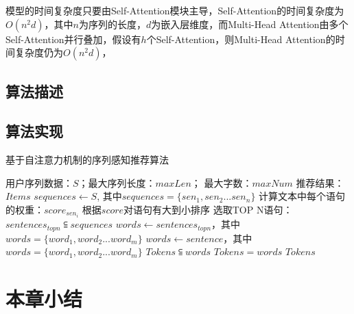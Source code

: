 模型的时间复杂度只要由Self-Attention模块主导，Self-Attention的时间复杂度为$O(n^{2} d)$，其中$n$为序列的长度，$d$为嵌入层维度，而Multi-Head Attention由多个Self-Attention并行叠加，假设有$h$个Self-Attention，则Multi-Head Attention的时间复杂度仍为$O(n^{2} d)$，


\subsection{算法描述}


\subsection{算法实现}
\begin{algorithm}[htbp]
	\caption{基于自注意力机制的序列感知推荐算法}
	\label{alg:self-attention}
		\begin{algorithmic}[1]
			\REQUIRE 用户序列数据：$S$；最大序列长度：$maxLen$； 最大字数：$maxNum$
			\ENSURE 推荐结果：$Items$
			\STATE $sequences \leftarrow S$, 其中$sequences=\{sen_{1}, sen_{2}...sen_{n}\}$
			    \STATE 计算文本中每个语句的权重：$score_{sen_{i}}$
			  \ENDFOR
			  \STATE 根据$score$对语句有大到小排序
			  \STATE 选取TOP N语句：$sentences_{topn} \subseteqq sequences$
			  \STATE $words \leftarrow sentences_{topn}$，其中 $words=\{word_{1}, word_{2}...word_{m}\}$
			\ELSE
			  \STATE $words \leftarrow sentence$，其中 $words=\{word_{1}, word_{2}...word_{m}\}$
			\ENDIF
			  \STATE $Tokens \subseteqq words$
			\ELSE
			  \STATE $Tokens = words $
			\ENDIF
			\RETURN $Tokens$
		\end{algorithmic}
\end{algorithm}


\section{本章小结}



